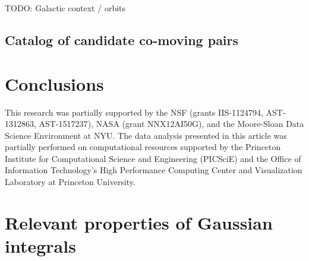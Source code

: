 \documentclass[manuscript, letterpaper]{aastex6}
\newcommand{\project}[1]{\textsl{#1}}
\newcommand{\acronym}[1]{{\small{#1}}}
\newcommand{\apogee}{\project{\acronym{APOGEE}}}
\newcommand{\todo}[1]{{\color{red}TODO: #1}}
\begin{document}
\todo{Galactic context / orbits}

\subsection{Catalog of candidate co-moving pairs}

\section{Conclusions}

\acknowledgements

This research was partially supported by the \acronym{NSF} (grants
  \acronym{IIS-1124794}, \acronym{AST-1312863}, \acronym{AST-1517237}),
  \acronym{NASA} (grant \acronym{NNX12AI50G}),
  and the Moore-Sloan Data Science Environment at \acronym{NYU}. The data
analysis presented in this article was partially performed on computational
resources supported by the Princeton Institute for Computational Science and
Engineering (PICSciE) and the Office of Information Technology's High
Performance Computing Center and Visualization Laboratory at Princeton
University.






\appendix

\section{Relevant properties of Gaussian integrals}
\label{sec:appendixA}
\end{document}
